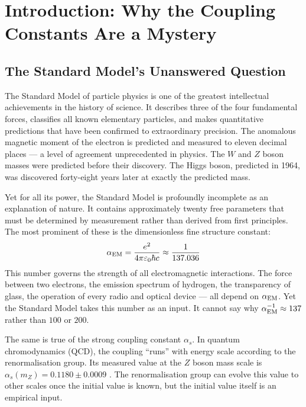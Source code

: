 \documentclass[12pt,a4paper]{article}
\begin{document}
\tableofcontents\bigskip

\section{Introduction: Why the Coupling Constants Are a Mystery}\label{sec:intro}

\subsection{The Standard Model's Unanswered Question}

The Standard Model of particle physics is one of the greatest intellectual achievements in the history of science.  It describes three of the four fundamental forces, classifies all known elementary particles, and makes quantitative predictions that have been confirmed to extraordinary precision.  The anomalous magnetic moment of the electron is predicted and measured to eleven decimal places --- a level of agreement unprecedented in physics.  The $W$ and $Z$ boson masses were predicted before their discovery.  The Higgs boson, predicted in 1964, was discovered forty-eight years later at exactly the predicted mass.

Yet for all its power, the Standard Model is profoundly incomplete as an explanation of nature.  It contains approximately twenty free parameters that must be determined by measurement rather than derived from first principles.  The most prominent of these is the dimensionless fine structure constant:
\begin{equation}
  \alpha_{\rm EM} = \frac{e^2}{4\pi\varepsilon_0\hbar c} \approx \frac{1}{137.036}
  \label{eq:alpha_def}
\end{equation}
This number governs the strength of all electromagnetic interactions.  The force between two electrons, the emission spectrum of hydrogen, the transparency of glass, the operation of every radio and optical device --- all depend on $\alpha_{\rm EM}$.  Yet the Standard Model takes this number as an input.  It cannot say why $\alpha_{\rm EM}^{-1}\approx137$ rather than $100$ or $200$.

The same is true of the strong coupling constant $\alpha_s$.  In quantum chromodynamics (QCD), the coupling ``runs'' with energy scale according to the renormalisation group.  Its measured value at the $Z$ boson mass scale is $\alpha_s(m_Z)=0.1180\pm0.0009$ \cite{PDG2024}.  The renormalisation group can evolve this value to other scales once the initial value is known, but the initial value itself is an empirical input.
\end{document}
